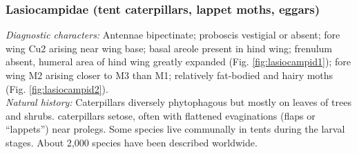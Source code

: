\documentclass[letterpaper, 11pt]{article}
\begin{document}
\subsubsection{Lasiocampidae (tent caterpillars, lappet moths, eggars)}
\noindent{}\textit{Diagnostic characters:} Antennae bipectinate; proboscis vestigial or absent; fore wing Cu2 arising near wing base; basal areole present in hind wing; frenulum absent, humeral area of hind wing greatly expanded (Fig. \ref{fig:lasiocampid1}); fore wing M2 arising closer to M3 than M1; relatively fat-bodied and hairy moths (Fig. \ref{fig:lasiocampid2}).\\

\noindent{}\textit{Natural history:} Caterpillars diversely phytophagous but mostly on leaves of trees and shrubs. caterpillars setose, often with flattened evaginations (flaps or ``lappets'') near prolegs. Some species live communally in tents during the larval stages. About 2,000 species have been described worldwide.
\end{document}
